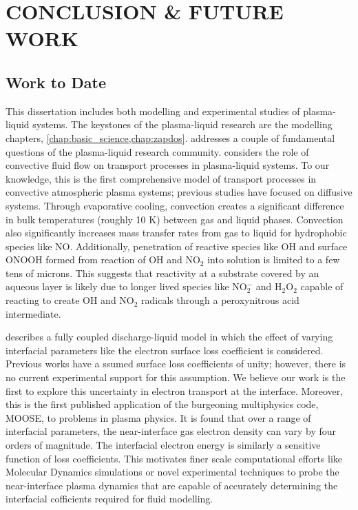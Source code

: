 \chapter{CONCLUSION \& FUTURE WORK}
\label{chap:conclusion}

\section{Work to Date}

This dissertation includes both modelling and experimental studies of plasma-liquid systems. The keystones of the plasma-liquid research are the modelling chapters, \cref{chap:basic_science,chap:zapdos}.  addresses a couple of fundamental questions of the plasma-liquid research community.  considers the role of convective fluid flow on transport processes in plasma-liquid systems. To our knowledge, this is the first comprehensive model of transport processes in convective atmospheric plasma systems; previous studies have focused on diffusive systems. \cite{Tian2014} Through evaporative cooling, convection creates a significant difference in bulk temperatures (roughly 10 K) between gas and liquid phases. Convection also significantly increases mass transfer rates from gas to liquid for hydrophobic species like NO. Additionally, penetration of reactive species like OH and surface ONOOH formed from reaction of OH and NO$_2$ into solution is limited to a few tens of microns. This suggests that reactivity at a substrate covered by an aqueous layer is likely due to longer lived species like NO$_2^-$ and H$_2$O$_2$ capable of reacting to create OH and NO$_2$ radicals through a peroxynitrous acid intermediate.

 describes a fully coupled discharge-liquid model in which the effect of varying interfacial parameters like the electron surface loss coefficient is considered. Previous works \cite{Tian2014,shirafuji2014numerical} have a ssumed surface loss coefficients of unity; however, there is no current experimental support for this assumption. We believe our work is the first to explore this uncertainty in electron transport at the interface. Moreover, this is the first published application of the burgeoning multiphysics code, MOOSE, to problems in plasma physics. It is found that over a range of interfacial parameters, the near-interface gas electron density can vary by four orders of magnitude. The interfacial electron energy is similarly a sensitive function of loss coefficients. This motivates finer scale computational efforts like Molecular Dynamics simulations or novel experimental techniques to probe the near-interface plasma dynamics that are capable of accurately determining the interfacial cofficients required for fluid modelling.


